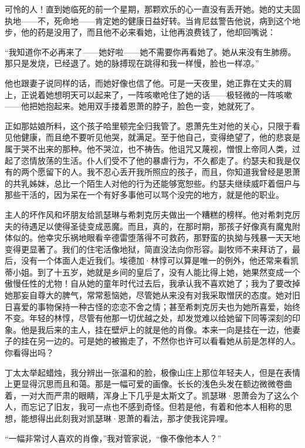 \par 可怜的人！直到她临死的前一个星期，那颗欢乐的心一直没有丢开她。她的丈夫固执地——不，死命地——肯定她的健康日益好转。当肯尼兹警告他说，病到这个地步，他的药是没用了，而且他不必来看她，让他再浪费钱了，他却回嘴说：
\par “我知道你不必再来了——她好啦——她不需要你再看她了。她从来没有生肺痨。那只是发烧，已经退了。她的脉搏现在跳得和我一样慢，脸也一样凉。”
\par 他也跟妻子说同样的话，而她好像也信了他。可是一天夜里，她正靠在丈夫的肩上，正说着她想明天可以起来了，一阵咳嗽呛住了她的话——极轻微的一阵咳嗽——他把她抱起来。她用双手搂着恩萧的脖子，脸色一变，她就死了。
\par 正如那姑娘所料，这个孩子哈里顿完全归我管了。恩萧先生对他的关心，只限于看见他健康，而且绝不要听见他哭，就满足。至于他自己，变得绝望了，他的悲哀是属于哭不出来的那种。他不哭泣，也不祷告。他诅咒又蔑视，憎恨上帝同人类，过起了恣情放荡的生活。仆人们受不了他的暴虐行为，不久都走了。约瑟夫和我是仅有的两个愿留下的人。我不忍心丢开我所照应的孩子，而且，你知道我曾经是恩萧的共乳姊妹，总比一个陌生人对他的行为还能够宽恕些。约瑟夫继续威吓着佃户与那些干活的，因为呆在一个有好多事他可以骂个没完的地方，就是他的职业。
\par 主人的坏作风和坏朋友给凯瑟琳与希刺克厉夫做出一个糟糕的榜样。他对希刺克厉夫的待遇足以使得圣徒变成恶魔。而且，真的，在那时期，那孩子好像真有魔鬼附体似的。他幸灾乐祸地眼看辛德雷堕落得不可救药，那野蛮的执拗与残暴一天天地变得更显著了。我们的住宅活像地狱，简直没法向你形容。副牧师不来拜访了，最后，没有一个体面人走近我们。埃德加·林惇可以算是唯一的例外，他还常来看凯蒂小姐。到了十五岁，她就是乡间的皇后了，没有人能比得上她，她果然变成一个傲慢任性的尤物！自从她的童年时代过去后，我承认我不喜欢她了；我为了要改掉她那妄自尊大的脾气，常常惹恼她，尽管她从来没有对我采取憎厌的态度。她对旧日喜爱的事物保持一种古怪的恋恋不舍之情；甚至希刺克厉夫也为她所喜爱，始终不变。年轻的林惇，尽管有他那一切优越之处，却发觉难以给她留下同等深刻的印象。他是我后来的主人，挂在壁炉上的就是他的肖像。本来一向是挂在一边，他妻子的挂在另一边的。可是她的被搬走了，不然你也许可以看看她从前是怎样的人。你看得出吗？
\par 丁太太举起蜡烛，我分辨出一张温和的脸，极像山庄上那位年轻夫人，但是在表情上更显得沉思而且和蔼。那是一幅可爱的画像。长长的浅色头发在额边微微卷曲着，一对大而严肃的眼睛，浑身上下几乎是太斯文了。凯瑟琳·恩萧会为了这么个人，而忘记了旧友，我可一点也不感到奇怪。但若是他，有着和他本人相称的思想，能想得出此刻我对凯瑟琳·恩萧的看法，那才使我诧异哩。
\par “一幅非常讨人喜欢的肖像，”我对管家说，“像不像他本人？”
